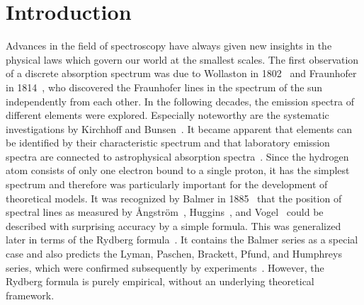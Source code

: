 \chapter*{Introduction}
Advances in the field of spectroscopy have always given new insights in the physical laws which govern our world at the smallest scales. %
The first observation of a discrete absorption spectrum was due to Wollaston in 1802~\cite{wollaston1802} and Fraunhofer in 1814~\cite{fraunhofer1817}, who discovered the Fraunhofer lines in the spectrum of the sun independently from each other.
In the following decades, the emission spectra of different elements were explored. Especially noteworthy are the systematic investigations by Kirchhoff and Bunsen~\cite{kirchhoff1860,kirchhoff1861}. It became apparent that elements can be identified by their characteristic spectrum and that laboratory emission spectra are connected to astrophysical absorption spectra~\cite{angstrom1862}.
Since the hydrogen atom consists of only one electron bound to a single proton, it has the simplest spectrum and therefore was particularly important for the development of theoretical models. It was recognized by Balmer in 1885~\cite{balmer1885} that the position of spectral lines as measured by Ångström~\cite{angstrom1853}, Huggins~\cite{huggins1880}, and Vogel~\cite{vogel1880} could be described with surprising accuracy by a simple formula. This was generalized later in terms of the Rydberg formula~\cite{rydberg1889,martinson2005}. It contains the Balmer series as a special case and also predicts the Lyman, Paschen, Brackett, Pfund, and Humphreys series, which were confirmed subsequently by experiments~\cite{lyman1906,paschen1908,brackett1922,pfund1924,humphrey1953}. However, the Rydberg formula is purely empirical, without an underlying theoretical framework.

